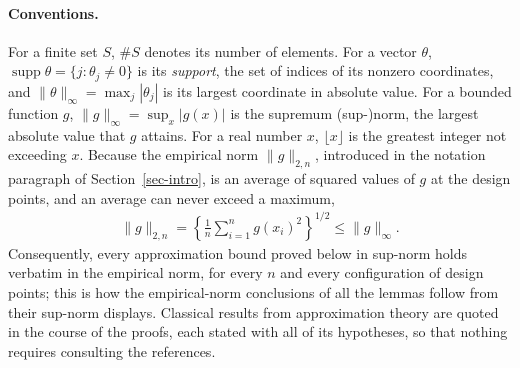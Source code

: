 \paragraph*{Conventions.}
For a finite set $S$, $\#S$ denotes its number of elements. For a vector $\theta$, $\operatorname{supp}\theta=\{j:\theta_j\neq0\}$ is its \emph{support}, the set of indices of its nonzero coordinates, and $\|\theta\|_\infty=\max_j|\theta_j|$ is its largest coordinate in absolute value. For a bounded function $g$, $\|g\|_\infty=\sup_x|g(x)|$ is the supremum (sup-)norm, the largest absolute value that $g$ attains. For a real number $x$, $\lfloor x\rfloor$ is the greatest integer not exceeding $x$. Because the empirical norm $\|g\|_{2,n}$, introduced in the notation paragraph of Section~\ref{sec-intro}, is an average of squared values of $g$ at the design points, and an average can never exceed a maximum,
\begin{align}
\|g\|_{2,n}=\left\{\frac1n\sum_{i=1}^ng(x_i)^2\right\}^{1/2}\leq\|g\|_\infty .
\label{eq:sup-to-empirical}
\end{align}
Consequently, every approximation bound proved below in sup-norm holds verbatim in the empirical norm, for every $n$ and every configuration of design points; this is how the empirical-norm conclusions of all the lemmas follow from their sup-norm displays. Classical results from approximation theory are quoted in the course of the proofs, each stated with all of its hypotheses, so that nothing requires consulting the references.

